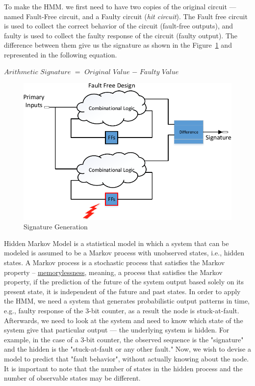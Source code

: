 To make the HMM. we first need to have two copies of the original circuit --- named Fault-Free circuit, and a Faulty circuit (\textit{hit circuit}). The Fault free circuit is used to collect the correct behavior of the circuit (fault-free outputs), and faulty is used to collect the faulty response of the circuit (faulty output). The difference between them give us the signature as shown in the Figure~\ref{fig:SG} and represented in the following equation.

\begin{center}
$Arithmetic$ $Signature$ $=$ $Original$ $Value$ $-$ $Faulty$ $Value$
\end{center}



 \begin{figure}[tb!]

 \centering
  \captionsetup{justification=centering}    
   \includegraphics[scale=0.8]{Figures/signature1.pdf}
   \caption{Signature Generation}
\label{fig:SG}
\end{figure}




Hidden Markov Model is a statistical model in which a system that can be modeled is assumed to be a Markov process with unobserved states, i.e., hidden states. A Markov process  is a stochastic process that satisfies the Markov property -- \underline{memorylessness}, meaning, a process that satisfies the Markov property, if the prediction of the future of the system output based solely on its present state, it is independent of the future and past states. In order to apply the HMM, we need a system that generates probabilistic output patterns in time, e.g., faulty response of the 3-bit counter, as a result the node is stuck-at-fault. Afterwards, we need to look at the system and need to know which state of the system give that particular output ---  the underlying system is hidden. For example, in the case of a 3-bit counter, the observed sequence is the "signature" and the hidden is the "stuck-at-fault or any other fault." Now, we wish to devise a model to predict that "fault behavior", without actually knowing about the node. It is important to note that the number of states in the hidden process and the number of observable states may be different. 


